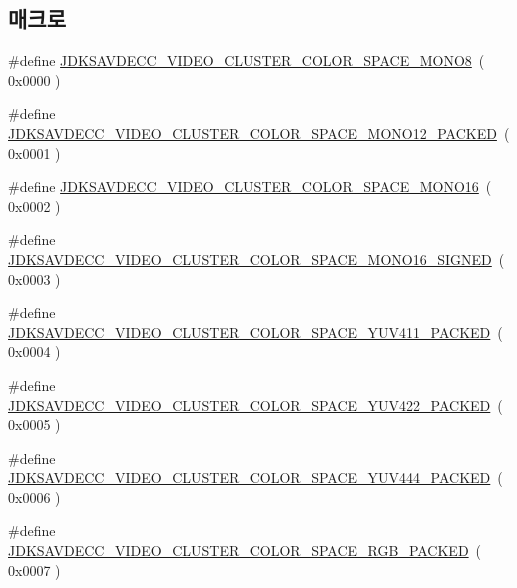 \subsection*{매크로}
\begin{DoxyCompactItemize}
\item 
\#define \hyperlink{group__video__cluster__color__space_ga92427a3fa1b84c83421a5212e02e80c5}{J\+D\+K\+S\+A\+V\+D\+E\+C\+C\+\_\+\+V\+I\+D\+E\+O\+\_\+\+C\+L\+U\+S\+T\+E\+R\+\_\+\+C\+O\+L\+O\+R\+\_\+\+S\+P\+A\+C\+E\+\_\+\+M\+O\+N\+O8}~( 0x0000 )
\item 
\#define \hyperlink{group__video__cluster__color__space_ga6e70754d789518b3c6f8db6838584cce}{J\+D\+K\+S\+A\+V\+D\+E\+C\+C\+\_\+\+V\+I\+D\+E\+O\+\_\+\+C\+L\+U\+S\+T\+E\+R\+\_\+\+C\+O\+L\+O\+R\+\_\+\+S\+P\+A\+C\+E\+\_\+\+M\+O\+N\+O12\+\_\+\+P\+A\+C\+K\+ED}~( 0x0001 )
\item 
\#define \hyperlink{group__video__cluster__color__space_gaeb618e42905123dc51b75972e5b5747f}{J\+D\+K\+S\+A\+V\+D\+E\+C\+C\+\_\+\+V\+I\+D\+E\+O\+\_\+\+C\+L\+U\+S\+T\+E\+R\+\_\+\+C\+O\+L\+O\+R\+\_\+\+S\+P\+A\+C\+E\+\_\+\+M\+O\+N\+O16}~( 0x0002 )
\item 
\#define \hyperlink{group__video__cluster__color__space_ga5de8613eed05d16ba97f0b754b07c2ba}{J\+D\+K\+S\+A\+V\+D\+E\+C\+C\+\_\+\+V\+I\+D\+E\+O\+\_\+\+C\+L\+U\+S\+T\+E\+R\+\_\+\+C\+O\+L\+O\+R\+\_\+\+S\+P\+A\+C\+E\+\_\+\+M\+O\+N\+O16\+\_\+\+S\+I\+G\+N\+ED}~( 0x0003 )
\item 
\#define \hyperlink{group__video__cluster__color__space_ga5baa7ae9603f7cd3352ea26b7007f7e5}{J\+D\+K\+S\+A\+V\+D\+E\+C\+C\+\_\+\+V\+I\+D\+E\+O\+\_\+\+C\+L\+U\+S\+T\+E\+R\+\_\+\+C\+O\+L\+O\+R\+\_\+\+S\+P\+A\+C\+E\+\_\+\+Y\+U\+V411\+\_\+\+P\+A\+C\+K\+ED}~( 0x0004 )
\item 
\#define \hyperlink{group__video__cluster__color__space_gaec2344e1f01e20f9d068d3b5d024989e}{J\+D\+K\+S\+A\+V\+D\+E\+C\+C\+\_\+\+V\+I\+D\+E\+O\+\_\+\+C\+L\+U\+S\+T\+E\+R\+\_\+\+C\+O\+L\+O\+R\+\_\+\+S\+P\+A\+C\+E\+\_\+\+Y\+U\+V422\+\_\+\+P\+A\+C\+K\+ED}~( 0x0005 )
\item 
\#define \hyperlink{group__video__cluster__color__space_ga8042d3b9ebc557058ba76df35887e2f7}{J\+D\+K\+S\+A\+V\+D\+E\+C\+C\+\_\+\+V\+I\+D\+E\+O\+\_\+\+C\+L\+U\+S\+T\+E\+R\+\_\+\+C\+O\+L\+O\+R\+\_\+\+S\+P\+A\+C\+E\+\_\+\+Y\+U\+V444\+\_\+\+P\+A\+C\+K\+ED}~( 0x0006 )
\item 
\#define \hyperlink{group__video__cluster__color__space_ga7db23794f595b8f0491337d8866fa6d2}{J\+D\+K\+S\+A\+V\+D\+E\+C\+C\+\_\+\+V\+I\+D\+E\+O\+\_\+\+C\+L\+U\+S\+T\+E\+R\+\_\+\+C\+O\+L\+O\+R\+\_\+\+S\+P\+A\+C\+E\+\_\+\+R\+G\+B\+\_\+\+P\+A\+C\+K\+ED}~( 0x0007 )

\end{DoxyCompactItemize}
